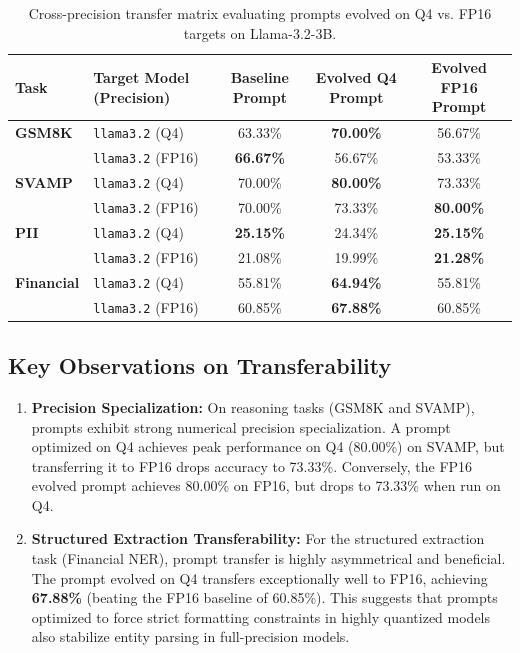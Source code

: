 \documentclass[11pt]{article}
\begin{document}
\begin{table}[t]
\centering
\small
\begin{tabular}{llccc}
\toprule
\textbf{Task} & \textbf{Target Model (Precision)} & \textbf{Baseline Prompt} & \textbf{Evolved Q4 Prompt} & \textbf{Evolved FP16 Prompt} \\
\midrule
\textbf{GSM8K} & \texttt{llama3.2} (Q4) & 63.33\% & \textbf{70.00\%} & 56.67\% \\
               & \texttt{llama3.2} (FP16) & \textbf{66.67\%} & 56.67\% & 53.33\% \\
\midrule
\textbf{SVAMP} & \texttt{llama3.2} (Q4) & 70.00\% & \textbf{80.00\%} & 73.33\% \\
               & \texttt{llama3.2} (FP16) & 70.00\% & 73.33\% & \textbf{80.00\%} \\
\midrule
\textbf{PII}   & \texttt{llama3.2} (Q4) & \textbf{25.15\%} & 24.34\% & \textbf{25.15\%} \\
               & \texttt{llama3.2} (FP16) & 21.08\% & 19.99\% & \textbf{21.28\%} \\
\midrule
\textbf{Financial} & \texttt{llama3.2} (Q4) & 55.81\% & \textbf{64.94\%} & 55.81\% \\
                   & \texttt{llama3.2} (FP16) & 60.85\% & \textbf{67.88\%} & 60.85\% \\
\bottomrule
\end{tabular}
\caption{Cross-precision transfer matrix evaluating prompts evolved on Q4 vs. FP16 targets on Llama-3.2-3B.}
\label{tab:transfer-matrix}
\end{table}

\subsection{Key Observations on Transferability}
\begin{enumerate}
    \item \textbf{Precision Specialization:} On reasoning tasks (GSM8K and SVAMP), prompts exhibit strong numerical precision specialization. A prompt optimized on Q4 achieves peak performance on Q4 (80.00\%) on SVAMP, but transferring it to FP16 drops accuracy to 73.33\%. Conversely, the FP16 evolved prompt achieves 80.00\% on FP16, but drops to 73.33\% when run on Q4.
    \item \textbf{Structured Extraction Transferability:} For the structured extraction task (Financial NER), prompt transfer is highly asymmetrical and beneficial. The prompt evolved on Q4 transfers exceptionally well to FP16, achieving \textbf{67.88\%} (beating the FP16 baseline of 60.85\%). This suggests that prompts optimized to force strict formatting constraints in highly quantized models also stabilize entity parsing in full-precision models.
\end{enumerate}
\end{document}
